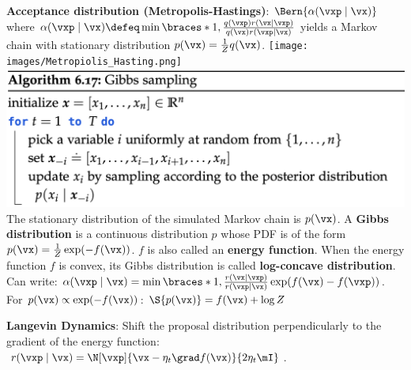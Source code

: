 \textbf{Acceptance distribution (Metropolis-Hastings)}: $\Bern{\alpha(\vxp \mid \vx)}$ where $\alpha(\vxp \mid \vx) \defeq \min \braces*{1, \frac{q(\vxp) r(\vx \mid \vxp)}{q(\vx) r(\vxp \mid \vx)}}$ yields a Markov chain with stationary distribution $p(\vx) = \frac{1}{Z} q(\vx)$.
\texttt{[image: images/Metropiolis\_Hasting.png]}
\includegraphics[width=0.98\linewidth]{images/Gibbs_Sampling.png} 
The stationary distribution of the simulated Markov chain is $p(\vx)$.
A \textbf{Gibbs distribution} is a continuous distribution $p$ whose PDF is of the form $p(\vx) = \frac{1}{Z} \exp(- f(\vx))$. $f$ is also called an \textbf{energy function}.
When the energy function $f$ is convex, its Gibbs distribution is called \textbf{log-concave distribution}. Can write: $\alpha(\vxp \mid \vx) = \min \braces*{1, \frac{r(\vx \mid \vxp)}{r(\vxp \mid \vx)} \exp(f(\vx) - f(\vxp))}$. \\
For $p(\vx) \propto \exp(-f(\vx))$: $\S{p(\vx)} = f(\vx) + \log Z$
\begin{framed}
    \textbf{Langevin Dynamics}: Shift the proposal distribution perpendicularly to the gradient of the energy function: $r(\vxp \mid \vx) = \N[\vxp]{\vx - \eta_t \grad f(\vx)}{2 \eta_t \mI}$.
\end{framed}
